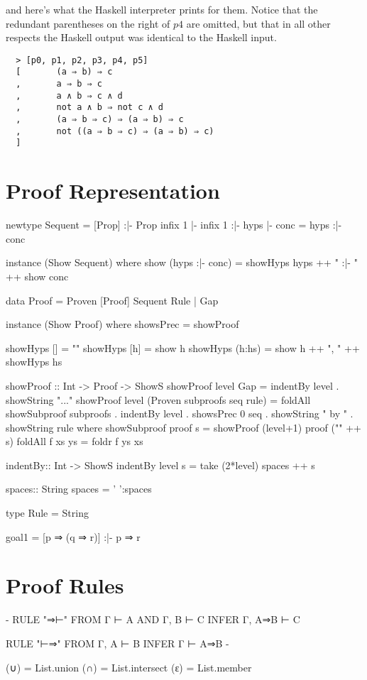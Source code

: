\documentclass[11pt]{article}
\begin{document}
and here's what the Haskell interpreter prints for them. Notice that the redundant
parentheses on the right of $p4$ are omitted, but that in all other respects 
the Haskell output was identical to the Haskell input.
\begin{verbatim}
  > [p0, p1, p2, p3, p4, p5]
  [       (a ⇒ b) ⇒ c
  ,       a ⇒ b ⇒ c
  ,       a ∧ b ⇒ c ∧ d
  ,       not a ∧ b ⇒ not c ∧ d
  ,       (a ⇒ b ⇒ c) ⇒ (a ⇒ b) ⇒ c
  ,       not ((a ⇒ b ⇒ c) ⇒ (a ⇒ b) ⇒ c)
  ]
\end{verbatim}


\section{Proof Representation}
\begin{code}
  newtype Sequent = [Prop] :|- Prop
  infix 1 |-
  infix 1 :|-
  hyps |- conc = hyps :|- conc
      
  instance (Show Sequent) where 
     show (hyps :|- conc) = showHyps hyps ++ " :|- " ++ show conc
     
  data    Proof   = Proven [Proof] Sequent Rule
                  | Gap
                  
  instance (Show Proof) where
     showsPrec = showProof 
     
  showHyps []     = ""
  showHyps [h]    = show h
  showHyps (h:hs) = show h ++  ", " ++ showHyps hs
  
  showProof :: Int -> Proof -> ShowS
  showProof level Gap = indentBy level . showString "..."
  showProof level (Proven subproofs seq rule) =
            foldAll showSubproof subproofs .
            indentBy level                 .
            showsPrec 0 seq                .
            showString " by "              .
            showString rule
            where 
            showSubproof proof s = showProof (level+1) proof ("\n" ++ s)
            foldAll f xs ys = foldr f ys xs         
                  
  indentBy:: Int -> ShowS
  indentBy level s = take (2*level) spaces ++ s
  
  spaces:: String
  spaces = ' ':spaces 
  
  type Rule = String

  goal1 = [p ⇒ (q ⇒ r)] :|- p ⇒ r

  
\end{code}

\section{Proof Rules}
\begin{code}[]
{-
        RULE  "⇒⊢"
        FROM  Γ       ⊢ A
        AND   Γ, B    ⊢ C
        INFER Γ, A⇒B ⊢ C 
        
        RULE  "⊢⇒"
        FROM  Γ, A ⊢ B
        INFER Γ    ⊢ A⇒B
-}
\end{code}
\begin{code}[]
  (∪) = List.union
  (∩) = List.intersect
  (ε)  = List.member
  
  
\end{code}
\end{document}
